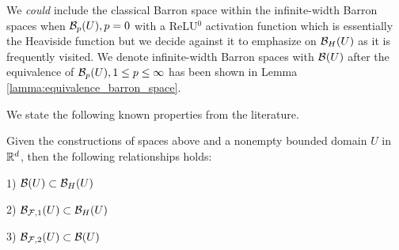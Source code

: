 We \textit{could} include the classical Barron space within the infinite-width
Barron spaces when $\mathcal{B}_{p}(U), p=0$ with a ReLU$^0$ activation function
which is essentially the Heaviside function but we decide against it to
emphasize on $\mathcal{B}_{H}(U)$ as it is frequently visited. We denote
infinite-width Barron spaces with $\mathcal{B}_{}(U)$ after the equivalence of
$\mathcal{B}_{p}(U), 1\leq p \leq\infty$ has been shown in Lemma
\ref{lamma:equivalence_barron_space}.

We state the following known properties from the literature.

\begin{lemma}
    Given the constructions of spaces above and a nonempty bounded domain $U$ in
    $\mathbb{R}^d$, then the following relationships holds:

    1) $\mathcal{B}(U) \subset \mathcal{B}_{H}(U)$

    2) $\mathcal{B}_{\mathcal{F}, 1}(U) \subset \mathcal{B}_{H}(U)$

    3) $\mathcal{B}_{\mathcal{F}, 2}(U) \subset \mathcal{B}(U)$
\end{lemma}


